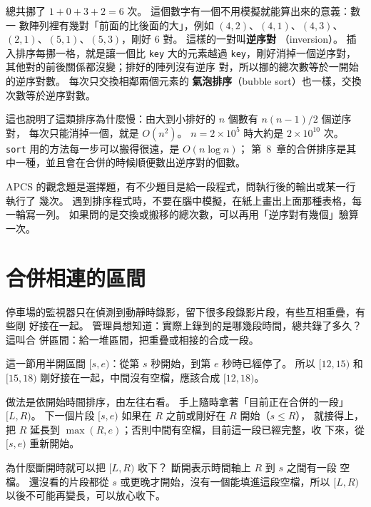 總共挪了 $1 + 0 + 3 + 2 = 6$ 次。 這個數字有一個不用模擬就能算出來的意義：數一
數陣列裡有幾對「前面的比後面的大」，例如 $(4, 2)$、$(4, 1)$、$(4, 3)$、
$(2, 1)$、$(5, 1)$、$(5, 3)$，剛好 $6$ 對。 這樣的一對叫\textbf{逆序對}
（inversion）。 插入排序每挪一格，就是讓一個比 \texttt{key} 大的元素越過
\texttt{key}，剛好消掉一個逆序對，其他對的前後關係都沒變；排好的陣列沒有逆序
對，所以挪的總次數等於一開始的逆序對數。 每次只交換相鄰兩個元素的
\textbf{氣泡排序}（bubble sort）也一樣，交換次數等於逆序對數。

這也說明了這類排序為什麼慢：由大到小排好的 $n$ 個數有 $n(n-1)/2$ 個逆序對，
每次只能消掉一個，就是 $O(n^2)$。 $n = 2 \times 10^5$ 時大約是 $2 \times
10^{10}$ 次。 \texttt{sort} 用的方法每一步可以搬得很遠，是 $O(n \log n)$；
第~8~章的合併排序是其中一種，並且會在合併的時候順便數出逆序對的個數。

\begin{apcsnote}
APCS 的觀念題是選擇題，有不少題目是給一段程式，問執行後的輸出或某一行執行了
幾次。 遇到排序程式時，不要在腦中模擬，在紙上畫出上面那種表格，每一輪寫一列。
如果問的是交換或搬移的總次數，可以再用「逆序對有幾個」驗算一次。
\end{apcsnote}

\section{合併相連的區間}
\label{sec:srt-merge}

停車場的監視器只在偵測到動靜時錄影，留下很多段錄影片段，有些互相重疊，有些剛
好接在一起。 管理員想知道：實際上錄到的是哪幾段時間，總共錄了多久？ 這叫合
併區間：給一堆區間，把重疊或相接的合成一段。

這一節用半開區間 $[s, e)$：從第 $s$ 秒開始，到第 $e$ 秒時已經停了。 所以
$[12, 15)$ 和 $[15, 18)$ 剛好接在一起，中間沒有空檔，應該合成 $[12, 18)$。

做法是依開始時間排序，由左往右看。 手上隨時拿著「目前正在合併的一段」
$[L, R)$。 下一個片段 $[s, e)$ 如果在 $R$ 之前或剛好在 $R$ 開始（$s \le R$），
就接得上，把 $R$ 延長到 $\max(R, e)$；否則中間有空檔，目前這一段已經完整，收
下來，從 $[s, e)$ 重新開始。

為什麼斷開時就可以把 $[L, R)$ 收下？ 斷開表示時間軸上 $R$ 到 $s$ 之間有一段
空檔。 還沒看的片段都從 $s$ 或更晚才開始，沒有一個能填進這段空檔，所以
$[L, R)$ 以後不可能再變長，可以放心收下。

